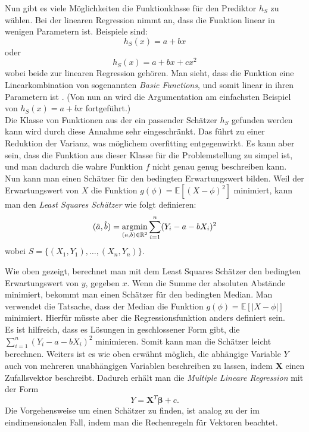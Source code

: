 Nun gibt es viele M\"oglichkeiten die Funktionklasse f\"ur den Prediktor $h_S$ zu w\"ahlen. Bei der linearen
Regression nimmt an, dass die Funktion linear in wenigen Parametern ist. Beispiele sind:
$$ h_S(x) = a + bx $$ 
oder 
$$ h_S(x) = a + bx + cx^2$$
wobei beide zur linearen Regression geh\"oren. Man sieht, dass die Funktion eine Linearkombination von sogenannten \textit{Basic Functions}, und somit 
linear in ihren Parametern ist \cite{bishop}. (Von nun an wird die Argumentation am einfachsten Beispiel von $ h_S(x) = a + bx $ fortgef\"uhrt.)\\ 

Die Klasse von Funktionen aus der ein passender Sch\"atzer $h_S$ gefunden werden kann wird durch diese Annahme sehr eingeschr\"ankt. Das f\"uhrt zu einer
Reduktion der Varianz, was m\"oglichem overfitting entgegenwirkt. Es kann aber sein, dass die Funktion aus dieser Klasse f\"ur die Problemstellung zu simpel ist, und 
man dadurch die wahre Funktion $f$ nicht genau genug beschreiben kann. \\

Nun kann man einen Sch\"atzer f\"ur den bedingten Erwartungswert bilden.
Weil der Erwartungswert von $X$ die Funktion $g(\phi) = \mathbb{E}[(X - \phi)^2]$ minimiert, kann man den \textit{Least Squares Sch\"atzer} wie folgt definieren:
$$ (\hat{a}, \hat{b}) = \operatorname*{argmin}_{(a,b) \in \mathbb{R}^2} \sum_{i=1}^n (Y_i - a - bX_i)^2$$
wobei $S = \{(X_1, Y_1), \dots , (X_n,Y_n)\}$.

Wie oben gezeigt, berechnet man mit dem Least Squares Sch\"atzer den bedingten Erwartungswert von $y$, gegeben $x$. 
Wenn die Summe der absoluten Abst\"ande minimiert, bekommt man einen Sch\"atzer f\"ur den bedingten Median. Man verwendet die Tatsache, dass
der Median die Funktion $g(\phi) = \mathbb{E}[|X - \phi|]$ minimiert. Hierfür müsste aber die Regressionsfunktion anders definiert sein. \\ 

Es ist hilfreich, dass es L\"osungen in geschlossener Form gibt, die $\sum_{i=1}^n (Y_i - a - bX_i)^2 $ minimieren. Somit kann man die Sch\"atzer leicht berechnen.
Weiters ist es wie oben erw\"ahnt m\"oglich, die abh\"angige Variable $Y$ auch von mehreren unabh\"angigen Variablen beschreiben zu lassen, indem $\mathbf{X}$ einen Zufallsvektor beschreibt.
Dadurch erh\"alt man die \textit{Multiple Lineare Regression} 
mit der Form 
$$ Y = \mathbf{X}^T\mathbf{\beta} + c. $$
Die Vorgehensweise um einen Sch\"atzer zu finden, ist analog zu der im eindimensionalen Fall, indem man die Rechenregeln f\"ur Vektoren beachtet. \\ 

